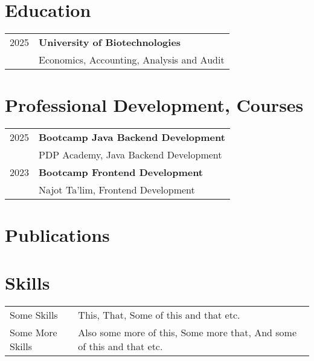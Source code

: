 \documentclass[a4paper,12pt]{article}
\begin{document}
\section{Education}
\begin{tabularx}{\linewidth}{@{}l X@{}}
2025 & \textbf{University of Biotechnologies} \\
     & Economics, Accounting, Analysis and Audit \\
\end{tabularx}

\vspace{1em}

\section{Professional Development, Courses}
\begin{tabularx}{\linewidth}{@{}l X@{}}
2025 & \textbf{Bootcamp Java Backend Development} \\
     & PDP Academy, Java Backend Development \\
2023 & \textbf{Bootcamp Frontend Development} \\
     & Najot Ta'lim, Frontend Development \\
\end{tabularx}

\section{Publications}
\begin{refsection}
\nocite{*}
\printbibliography[heading=none]
\end{refsection}

\section{Skills}
\begin{tabularx}{\linewidth}{@{}l X@{}}
Some Skills &  \normalsize{This, That, Some of this and that etc.}\\
Some More Skills  &  \normalsize{Also some more of this, Some more that, And some of this and that etc.}\\  
\end{tabularx}

\vfill
{}
\end{document}
